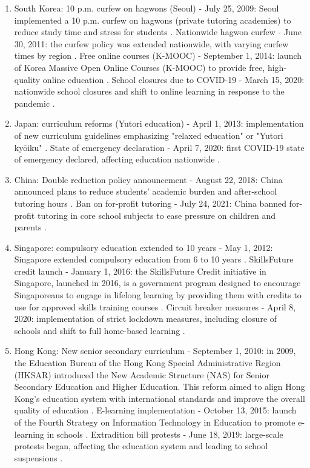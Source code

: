 \documentclass[12pt,a4paper,onecolumn]{article}
\numberwithin{equation}{section}
\begin{document}
\begin{enumerate}
    \item South Korea: 10 p.m. curfew on hagwons (Seoul) - July 25, 2009: Seoul implemented a 10 p.m. curfew on hagwons (private tutoring academies) to reduce study time and stress for students \parencite{lee2011impact}. Nationwide hagwon curfew - June 30, 2011: the curfew policy was extended nationwide, with varying curfew times by region \parencite{bray2014regulating}. Free online courses (K-MOOC) - September 1, 2014: launch of Korea Massive Open Online Courses (K-MOOC) to provide free, high-quality online education \parencite{kim2015efa}. School closures due to COVID-19 - March 15, 2020: nationwide school closures and shift to online learning in response to the pandemic \parencite{kim2020school}.
 
 \item Japan: curriculum reforms (Yutori education) - April 1, 2013: implementation of new curriculum guidelines emphasizing "relaxed education" or "Yutori kyōiku" \parencite{bjork2019high}. State of emergency declaration - April 7, 2020: first COVID-19 state of emergency declared, affecting education nationwide \parencite{yamamoto2010cultural}.

\item China: Double reduction policy announcement - August 22, 2018: China announced plans to reduce students' academic burden and after-school tutoring hours \parencite{chen2024examining}. Ban on for-profit tutoring - July 24, 2021: China banned for-profit tutoring in core school subjects to ease pressure on children and parents \parencite{chinalawtranslate2021}.

\item Singapore: compulsory education extended to 10 years - May 1, 2012: Singapore extended compulsory education from 6 to 10 years \parencite{ministry2012compulsory}. SkillsFuture credit launch - January 1, 2016: the SkillsFuture Credit initiative in Singapore, launched in 2016, is a government program designed to encourage Singaporeans to engage in lifelong learning by providing them with credits to use for approved skills training courses \parencite{skillsfuture2016credit}. Circuit breaker measures - April 8, 2020: implementation of strict lockdown measures, including closure of schools and shift to full home-based learning \parencite{ministry2020homebased}.

\item Hong Kong: New senior secondary curriculum - September 1, 2010: in 2009, the Education Bureau of the Hong Kong Special Administrative Region (HKSAR) introduced the New Academic Structure (NAS) for Senior Secondary Education and Higher Education. This reform aimed to align Hong Kong's education system with international standards and improve the overall quality of education \parencite{educationbureau2009nas}. E-learning implementation - October 13, 2015: launch of the Fourth Strategy on Information Technology in Education to promote e-learning in schools \parencite{educationbureau2009nas}. Extradition bill protests - June 18, 2019: large-scale protests began, affecting the education system and leading to school suspensions \parencite{pang2020gazing}.
\end{enumerate}
\end{document}
